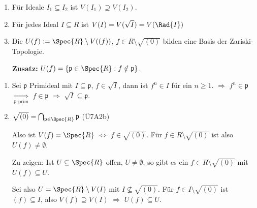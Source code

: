 \begin{Bem}

\begin{enumerate}
\item F\"ur Ideale $I_1 \subseteq I_2$ ist $V(I_1) \supseteq V(I_2)$.

\item F\"ur jedes Ideal $I \subseteq R$ ist $V(I) = V(\sqrt{I}) = V(\Rad{I})$

\item
Die $U(f) := \Spec{R}\setminus V( (f) )$, $f \in R \setminus \sqrt{(0)}$ bilden
eine Basis der Zariski-Topologie.

\begin{Bew}
\textbf{Zusatz:} $U(f) = \{ \mathfrak{p} \in \Spec{R} : f \notin \mathfrak{p} \}$.

\end{Bew}

\end{enumerate}

\end{Bem}

\begin{Bew}
\begin{enumerate}
\item Sei $\mathfrak{p}$ Primideal mit $I \subseteq \mathfrak{p}$, $f \in
\sqrt{I}$, dann ist $f^n \in I$ f\"ur ein $n \geq 1$. $\Rightarrow$ $f^n \in
\mathfrak{p}$ $\underset{\mathfrak{p} \text{ prim}}\Rightarrow$ $f \in
\mathfrak{p}$ $\Rightarrow$ $\sqrt{I} \subseteq \mathfrak{p}$.
\item 
$\sqrt{(0)} = \bigcap_{\mathfrak{p} \in \Spec{R}}{\mathfrak{p}}$ (\"U7A2b)

Also ist $V(f) = \Spec{R}$ $\Leftrightarrow$ $f \in \sqrt{(0)}$. F\"ur $f \in R \setminus \sqrt{(0)}$ ist also $U(f) \neq \emptyset$.

Zu zeigen: Ist $U \subseteq \Spec{R}$ offen, $U \neq \emptyset$, so gibt es ein $f \in R \setminus \sqrt{(0)}$ mit $U(f) \subseteq U$.

Sei also $U = \Spec{R}\setminus V(I)$ mit $I \nsubseteq \sqrt{(0)}$. F\"ur $f
\in I \setminus \sqrt{(0)}$ ist $(f) \subseteq I$, also $V(f) \supseteq V(I)$
$\Rightarrow$ $U(f) \subseteq U$. 
\end{enumerate}
\end{Bew}

